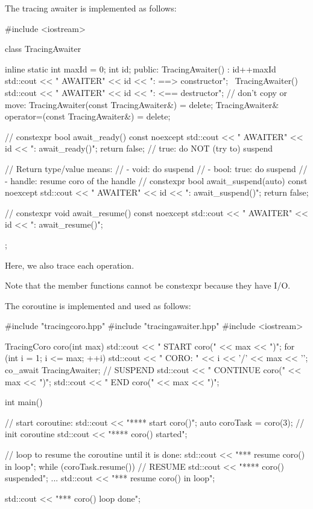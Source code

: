 The tracing awaiter is implemented as follows:


\begin{cpp}
#include <iostream>

class TracingAwaiter {
	inline static int maxId = 0;
	int id;
	public:
	TracingAwaiter() : id{++maxId} {
		std::cout << " AWAITER" << id << ": ==> constructor\n";
	}
	~TracingAwaiter() {
		std::cout << " AWAITER" << id << ": <== destructor\n";
	}
	// don’t copy or move:
	TracingAwaiter(const TracingAwaiter&) = delete;
	TracingAwaiter& operator=(const TracingAwaiter&) = delete;
	
	// constexpr
	bool await_ready() const noexcept {
		std::cout << " AWAITER" << id << ": await_ready()\n";
		return false; // true: do NOT (try to) suspend
	}
	
	// Return type/value means:
	// - void: do suspend
	// - bool: true: do suspend
	// - handle: resume coro of the handle
	// constexpr
	bool await_suspend(auto) const noexcept {
		std::cout << " AWAITER" << id << ": await_suspend()\n";
		return false;
	}
	
	// constexpr
	void await_resume() const noexcept {
		std::cout << " AWAITER" << id << ": await_resume()\n";
	}
};
\end{cpp}

Here, we also trace each operation.

Note that the member functions cannot be constexpr because they have I/O.

The coroutine is implemented and used as follows:


\begin{cpp}
#include "tracingcoro.hpp"
#include "tracingawaiter.hpp"
#include <iostream>

TracingCoro coro(int max)
{
	std::cout << " START coro(" << max << ")\n";
	for (int i = 1; i <= max; ++i) {
		std::cout << "  CORO: " << i << '/' << max << '\n';
		co_await TracingAwaiter{}; // SUSPEND
		std::cout << "   CONTINUE coro(" << max << ")\n";
	}
	std::cout << "  END coro(" << max << ")\n";
}

int main()
{
	// start coroutine:
	std::cout << "**** start coro()\n";
	auto coroTask = coro(3); // init coroutine
	std::cout << "**** coro() started\n";
	
	// loop to resume the coroutine until it is done:
	std::cout << "\n**** resume coro() in loop\n";
	while (coroTask.resume()) { // RESUME
		std::cout << "**** coro() suspended\n";
		...
		std::cout << "\n**** resume coro() in loop\n";
	}
	
	std::cout << "\n**** coro() loop done\n";
}
\end{cpp}

